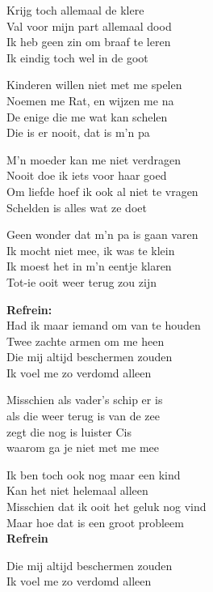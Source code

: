 Krijg toch allemaal de klere\\
Val voor mijn part allemaal dood\\
Ik heb geen zin om braaf te leren\\
Ik eindig toch wel in de goot

Kinderen willen niet met me spelen\\
Noemen me Rat, en wijzen me na\\
De enige die me wat kan schelen\\
Die is er nooit, dat is m'n pa

M'n moeder kan me niet verdragen\\
Nooit doe ik iets voor haar goed\\
Om liefde hoef ik ook al niet te vragen\\
Schelden is alles wat ze doet

Geen wonder dat m'n pa is gaan varen\\
Ik mocht niet mee, ik was te klein\\
Ik moest het in m'n eentje klaren\\
Tot-ie ooit weer terug zou zijn

\textbf{Refrein:}\\
Had ik maar iemand om van te houden\\
Twee zachte armen om me heen\\
Die mij altijd beschermen zouden\\
Ik voel me zo verdomd alleen

Misschien als vader's schip er is\\
als die weer terug is van de zee\\
zegt die nog is luister Cis\\
waarom ga je niet met me mee

Ik ben toch ook nog maar een kind\\
Kan het niet helemaal alleen\\
Misschien dat ik ooit het geluk nog vind\\
Maar hoe dat is een groot probleem\\

\textbf{Refrein}

Die mij altijd beschermen zouden\\
Ik voel me zo verdomd alleen
